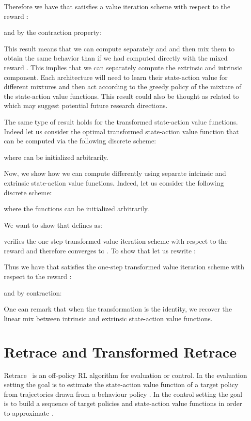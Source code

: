 \documentclass{article}
\begin{document}
Therefore we have that  satisfies a value iteration scheme with respect to the reward :

and by the contraction property:


This result means that we can compute separately  and  and then mix them to obtain the same behavior than if we had computed  directly with the mixed reward . This implies that we can separately compute the extrinsic and intrinsic component. Each architecture will need to learn their state-action value for different mixtures  and then act according to the greedy policy of the mixture of the state-action value functions. This result could also be thought as related to~\citet{barreto2017successor} which may suggest potential future research directions.

The same type of result holds for the transformed state-action value functions. Indeed let us consider the optimal transformed state-action value function  that can be computed via the following discrete scheme:

where  can be initialized arbitrarily.

Now, we show how we can compute  differently using separate intrinsic and extrinsic state-action value functions. Indeed, let us consider the following discrete scheme:

where the functions  can be initialized arbitrarily.

We want to show that  defines as:

verifies the one-step transformed value iteration scheme with respect to the reward  and therefore converges to . To show that let us rewrite :


Thus we have that  satisfies the one-step transformed value iteration scheme with respect to the reward :

and by contraction:


One can remark that when the transformation  is the identity, we recover the linear mix between intrinsic and extrinsic state-action value functions.
 \section{Retrace and Transformed Retrace}
\label{app:retrace}
Retrace~\citep{munos2016safe} is an off-policy RL algorithm for evaluation or control. In the evaluation setting the goal is to estimate the state-action value function  of a target policy  from trajectories drawn from a behaviour policy . In the control setting the goal is to build a sequence of target policies  and state-action value functions  in order to approximate .
\end{document}
